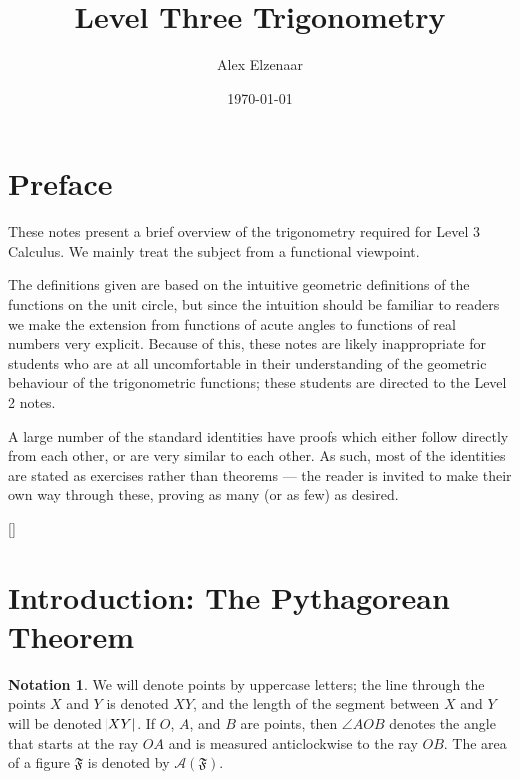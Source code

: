\documentclass[a4paper,leqno]{article}
\title{Level Three Trigonometry}
\author{Alex Elzenaar}
\date{\today}
\numberwithin{equation}{section}
\theoremstyle{definition}
\newtheorem{notation}[equation]{Notation}
\theoremstyle{remark}
\begin{document}
\maketitle
\tableofcontents
\section*{Preface}
These notes present a brief overview of the trigonometry required for Level 3 Calculus. We
mainly treat the subject from a functional viewpoint.

The definitions given are based on the intuitive geometric definitions of the functions on
the unit circle, but since the intuition should be familiar to readers we make the extension
from functions of acute angles to functions of real numbers very explicit. Because of this, these
notes are likely inappropriate for students who are at all uncomfortable in their understanding of
the geometric behaviour of the trigonometric functions; these students are directed to the
Level 2 notes.

A large number of the standard identities have proofs which either follow directly from each other,
or are very similar to each other. As such, most of the identities are stated as exercises rather
than theorems --- the reader is invited to make their own way through these, proving as many (or
as few) as desired.

[{\titlerule[0.8pt]}]
\let\oldsection\section
\renewcommand\section{\clearpage\oldsection}
\section{Introduction: The Pythagorean Theorem}
\begin{notation}
  We will denote points by uppercase letters; the line through the points $ X $ and $ Y $ is denoted $ XY $, and the length of the
  segment between $ X $ and $ Y $ will be denoted $ \abs{XY} $. If $ O $, $ A $, and $ B $ are points, then $ \angle AOB $ denotes
  the angle that starts at the ray $ OA $ and is measured anticlockwise to the ray $ OB $. The area of a figure $ \mathfrak{F} $ is
  denoted by $ \mathcal{A}(\mathfrak{F}) $.
\end{notation}
\end{document}
